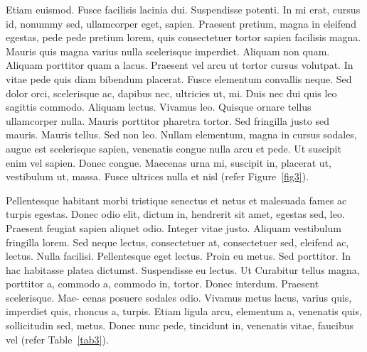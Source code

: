 \documentclass[CJCE,STIX2COL]{WileyNJD-v2}
\begin{document}
Etiam euismod. Fusce facilisis lacinia dui. Suspendisse potenti. In mi erat, cursus id, nonummy sed, ullamcorper
eget, sapien. Praesent pretium, magna in eleifend egestas, pede pede pretium lorem, quis consectetuer tortor sapien
facilisis magna. Mauris quis magna varius nulla scelerisque imperdiet. Aliquam non quam. Aliquam porttitor quam
a lacus. Praesent vel arcu ut tortor cursus volutpat. In vitae pede quis diam bibendum placerat. Fusce elementum
convallis neque. Sed dolor orci, scelerisque ac, dapibus nec, ultricies ut, mi. Duis nec dui quis leo sagittis commodo.
Aliquam lectus. Vivamus leo. Quisque ornare tellus ullamcorper nulla. Mauris porttitor pharetra tortor. Sed fringilla
justo sed mauris. Mauris tellus. Sed non leo. Nullam elementum, magna in cursus sodales, augue est scelerisque
sapien, venenatis congue nulla arcu et pede. Ut suscipit enim vel sapien. Donec congue. Maecenas urna mi, suscipit
in, placerat ut, vestibulum ut, massa. Fusce ultrices nulla et nisl (refer Figure~\ref{fig3}).

Pellentesque habitant morbi tristique senectus et netus et malesuada fames ac turpis egestas. Donec odio elit,
dictum in, hendrerit sit amet, egestas sed, leo. Praesent feugiat sapien aliquet odio. Integer vitae justo. Aliquam
vestibulum fringilla lorem. Sed neque lectus, consectetuer at, consectetuer sed, eleifend ac, lectus. Nulla facilisi.
Pellentesque eget lectus. Proin eu metus. Sed porttitor. In hac habitasse platea dictumst. Suspendisse eu lectus. Ut Curabitur tellus magna, porttitor a, commodo a, commodo in, tortor. Donec interdum. Praesent scelerisque. Mae-
cenas posuere sodales odio. Vivamus metus lacus, varius quis, imperdiet quis, rhoncus a, turpis. Etiam ligula arcu,
elementum a, venenatis quis, sollicitudin sed, metus. Donec nunc pede, tincidunt in, venenatis vitae, faucibus vel (refer Table~\ref{tab3}).
\end{document}
